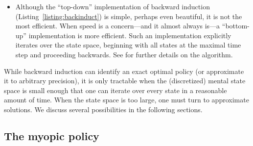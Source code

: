 \begin{itemize}
  \item Although the ``top-down'' implementation of backward induction (Listing~\ref{listing:backinduct}) is simple, perhaps even beautiful, it is not the most efficient. When speed is a concern---and it almost always is---a ``bottom-up'' implementation is more efficient. Such an implementation explicitly iterates over the state space, beginning with all states at the maximal time step and proceeding backwards. See \citet{puterman2014markov} for further details on the algorithm.
\end{itemize}





\separator

While backward induction can identify an exact optimal policy (or approximate it to arbitrary precision), it is only tractable when the (discretized) mental state space is small enough that one can iterate over every state in a reasonable amount of time. When the state space is too large, one must turn to approximate solutions. We discuss several possibilities in the following sections.

\subsection{The myopic policy}

